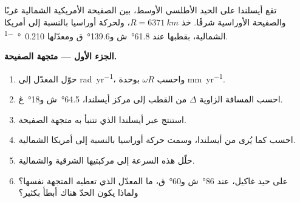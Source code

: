 \begin{problem}
\label{pb:b1:plate-kinematics:1}
تقع أيسلندا على الحيد الأطلسي الأوسط، بين الصفيحة الأمريكية الشمالية غربًا والصفيحة الأوراسية شرقًا. خذ $R = \qty{6371}{km}$، ولحركة أوراسيا بالنسبة إلى أمريكا الشمالية،  بقطبها عند \ang{61.8}~ش و\ang{139.6}~ق ومعدّلها \qty{0.210}{\degree\per\Myr}.

\medskip
\noindent\textbf{الجزء الأول --- متجهة الصفيحة.}
\begin{enumerate}
  \item حوّل المعدّل إلى \unit{rad.yr^{-1}}، واحسب $\omega R$ بوحدة \unit{mm.yr^{-1}}.
  \item احسب المسافة الزاوية $\Delta$ من القطب إلى مركز أيسلندا، \ang{64.5}~ش و\ang{18}~غ.
  \item استنتج  عبر أيسلندا الذي تتنبأ به متجهة الصفيحة.
  \item احسب  كما يُرى من أيسلندا، وسمت حركة أوراسيا بالنسبة إلى أمريكا الشمالية.
  \item حلّل هذه السرعة إلى مركبتيها الشرقية والشمالية.
  \item على حيد غاكيل، عند \ang{86}~ش و\ang{60}~ق، ما المعدّل الذي تعطيه المتجهة نفسها؟ ولماذا يكون الحدّ هناك أبطأ بكثير؟
\end{enumerate}


\end{problem}
